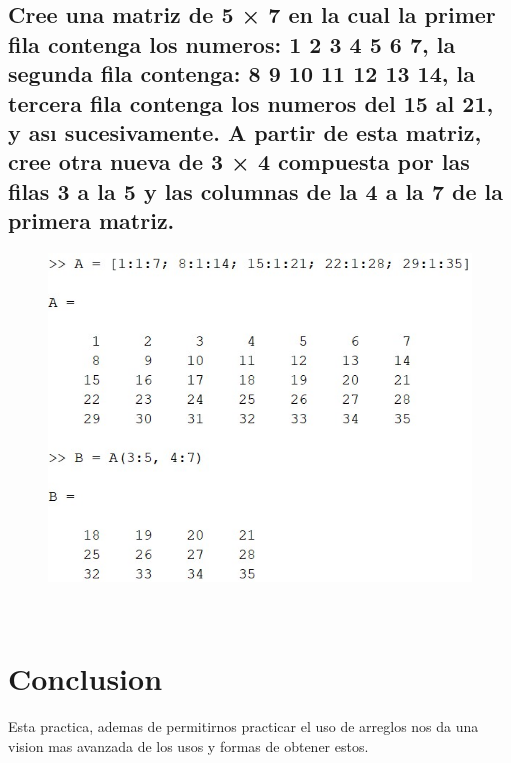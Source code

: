 \documentclass{article}
\begin{document}
\subsection{Cree una matriz de 5 × 7 en la cual la primer fila contenga los numeros: 1 2 3 4 5 6 7, la segunda fila contenga: 8 9 10 11 12 13 14, la tercera fila contenga los numeros del 15 al 21, y ası sucesivamente. A partir de esta matriz, cree otra nueva de 3 × 4 compuesta por las filas 3 a la 5 y las columnas de la 4 a la 7 de la primera matriz.}


\begin{figure}[H]
    \centering
    \includegraphics[width = 18cm]{img9.jpg}
\end{figure}

\
\
\

\section{Conclusion}

Esta practica, ademas de permitirnos practicar el uso de arreglos nos da una vision mas avanzada de los usos y formas de obtener estos.
\end{document}

